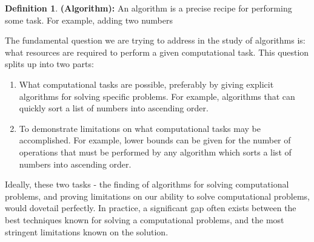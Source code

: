\documentclass[12pt, oneside]{book}
\theoremstyle{definition}
\newtheorem{definition}{Definition}[section]
\theoremstyle{definition}
\theoremstyle{remark}
\begin{document}
\begin{definition}
    \textbf{(Algorithm):} An algorithm is a precise recipe for performing some task.
    For example, adding two numbers
\end{definition}

The fundamental question we are trying to address in the study of algorithms is: what resources are required to perform a given computational task. This question splits up into two parts:
\begin{enumerate}
    \item What computational tasks are possible, preferably by giving explicit algorithms for solving specific problems. For example, algorithms that can quickly sort a list of numbers into ascending order.
    \item To demonstrate limitations on what computational tasks may be accomplished. For example, lower bounds can be given for the number of operations that must be performed by any algorithm which sorts a list of numbers into ascending order.
\end{enumerate}
Ideally, these two tasks - the finding of algorithms for solving computational problems, and proving limitations on our ability to solve computational problems, would dovetail perfectly. In practice, a significant gap often exists between the best techniques known for solving a computational problems, and the most stringent limitations known on the solution.
\end{document}

